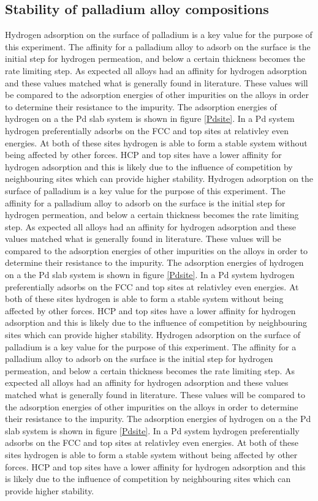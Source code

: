 \subsection{Stability of palladium alloy compositions}
Hydrogen adsorption on the surface of palladium is a key value for the purpose of this experiment. The affinity for a palladium alloy to adsorb on the surface is the initial step for hydrogen permeation, and below a certain thickness becomes the rate limiting step. As expected all alloys had an affinity for hydrogen adsorption and these values matched what is generally found in literature. These values will be compared to the adsorption energies of other impurities on the alloys in order to determine their resistance to the impurity. The adsorption energies of hydrogen on a the Pd slab system is shown in figure \ref{Pdsite}. In a Pd system hydrogen preferentially adsorbs on the FCC and top sites at relativley even energies. At both of these sites hydrogen is able to form a stable system without being affected by other forces. HCP and top sites have a  lower affinity for hydrogen adsorption and this is likely due to the influence of competition by neighbouring sites which can provide higher stability.
Hydrogen adsorption on the surface of palladium is a key value for the purpose of this experiment. The affinity for a palladium alloy to adsorb on the surface is the initial step for hydrogen permeation, and below a certain thickness becomes the rate limiting step. As expected all alloys had an affinity for hydrogen adsorption and these values matched what is generally found in literature. These values will be compared to the adsorption energies of other impurities on the alloys in order to determine their resistance to the impurity. The adsorption energies of hydrogen on a the Pd slab system is shown in figure \ref{Pdsite}. In a Pd system hydrogen preferentially adsorbs on the FCC and top sites at relativley even energies. At both of these sites hydrogen is able to form a stable system without being affected by other forces. HCP and top sites have a  lower affinity for hydrogen adsorption and this is likely due to the influence of competition by neighbouring sites which can provide higher stability.
Hydrogen adsorption on the surface of palladium is a key value for the purpose of this experiment. The affinity for a palladium alloy to adsorb on the surface is the initial step for hydrogen permeation, and below a certain thickness becomes the rate limiting step. As expected all alloys had an affinity for hydrogen adsorption and these values matched what is generally found in literature. These values will be compared to the adsorption energies of other impurities on the alloys in order to determine their resistance to the impurity. The adsorption energies of hydrogen on a the Pd slab system is shown in figure \ref{Pdsite}. In a Pd system hydrogen preferentially adsorbs on the FCC and top sites at relativley even energies. At both of these sites hydrogen is able to form a stable system without being affected by other forces. HCP and top sites have a  lower affinity for hydrogen adsorption and this is likely due to the influence of competition by neighbouring sites which can provide higher stability.


